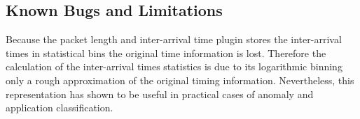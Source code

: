 \documentclass[documentation]{subfiles}
\begin{document}

\subsection{Known Bugs and Limitations}
Because the packet length and inter-arrival time plugin stores the inter-arrival times in statistical bins the original time information is lost. Therefore the calculation of the inter-arrival times statistics is due to its logarithmic binning only a rough approximation of the original timing information. Nevertheless, this representation has shown to be useful in practical cases of anomaly and application classification.

\end{document}
